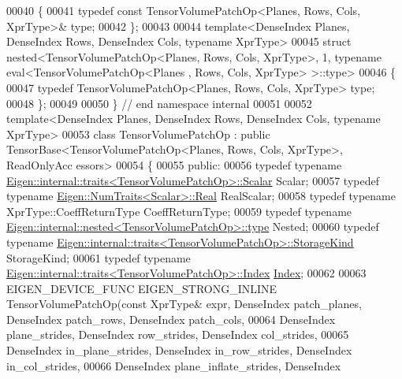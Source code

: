 \begin{DoxyCode}
00040 \{
00041   \textcolor{keyword}{typedef} \textcolor{keyword}{const} TensorVolumePatchOp<Planes, Rows, Cols, XprType>& type;
00042 \};
00043 
00044 \textcolor{keyword}{template}<DenseIndex Planes, DenseIndex Rows, DenseIndex Cols, \textcolor{keyword}{typename} XprType>
00045 \textcolor{keyword}{struct }nested<TensorVolumePatchOp<Planes, Rows, Cols, XprType>, 1, typename eval<TensorVolumePatchOp<Planes
      , Rows, Cols, XprType> >::type>
00046 \{
00047   \textcolor{keyword}{typedef} TensorVolumePatchOp<Planes, Rows, Cols, XprType> type;
00048 \};
00049 
00050 \}  \textcolor{comment}{// end namespace internal}
00051 
00052 \textcolor{keyword}{template}<DenseIndex Planes, DenseIndex Rows, DenseIndex Cols, \textcolor{keyword}{typename} XprType>
00053 \textcolor{keyword}{class }TensorVolumePatchOp : \textcolor{keyword}{public} TensorBase<TensorVolumePatchOp<Planes, Rows, Cols, XprType>, ReadOnlyAcc
      essors>
00054 \{
00055   \textcolor{keyword}{public}:
00056   \textcolor{keyword}{typedef} \textcolor{keyword}{typename} \hyperlink{struct_eigen_1_1internal_1_1traits}{Eigen::internal::traits<TensorVolumePatchOp>::Scalar}
       Scalar;
00057   \textcolor{keyword}{typedef} \textcolor{keyword}{typename} \hyperlink{group___sparse_core___module}{Eigen::NumTraits<Scalar>::Real} RealScalar;
00058   \textcolor{keyword}{typedef} \textcolor{keyword}{typename} XprType::CoeffReturnType CoeffReturnType;
00059   \textcolor{keyword}{typedef} \textcolor{keyword}{typename} \hyperlink{class_eigen_1_1internal_1_1_tensor_lazy_evaluator_writable}{Eigen::internal::nested<TensorVolumePatchOp>::type}
       Nested;
00060   \textcolor{keyword}{typedef} \textcolor{keyword}{typename} \hyperlink{struct_eigen_1_1internal_1_1traits}{Eigen::internal::traits<TensorVolumePatchOp>::StorageKind}
       StorageKind;
00061   \textcolor{keyword}{typedef} \textcolor{keyword}{typename} \hyperlink{struct_eigen_1_1internal_1_1traits}{Eigen::internal::traits<TensorVolumePatchOp>::Index}
       \hyperlink{namespace_eigen_a62e77e0933482dafde8fe197d9a2cfde}{Index};
00062 
00063   EIGEN\_DEVICE\_FUNC EIGEN\_STRONG\_INLINE TensorVolumePatchOp(\textcolor{keyword}{const} XprType& expr, DenseIndex patch\_planes, 
      DenseIndex patch\_rows, DenseIndex patch\_cols,
00064                                                             DenseIndex plane\_strides, DenseIndex 
      row\_strides, DenseIndex col\_strides,
00065                                                             DenseIndex in\_plane\_strides, DenseIndex 
      in\_row\_strides, DenseIndex in\_col\_strides,
00066                                                             DenseIndex plane\_inflate\_strides, DenseIndex 

\end{DoxyCode}
